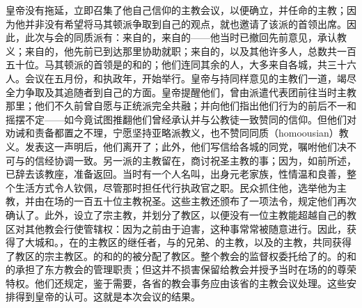 皇帝没有拖延，立即召集了他自己信仰的主教会议，以便确立，并任命的主教；因为他并非没有希望将马其顿派争取到自己的观点，就也邀请了该派的首领出席。因此，此次与会的同质派有：来自的，来自的——他当时已撤回先前意见，承认教义；来自的，他先前已到达那里协助就职；来自的，以及其他许多人，总数共一百五十位。马其顿派的首领是的和的；他们连同其余的人，大多来自各城，共三十六人。会议在五月份，和执政年，开始举行。皇帝与持同样意见的主教们一道，竭尽全力争取及其追随者到自己的方面。皇帝提醒他们，曾由派遣代表团前往当时主教那里；他们不久前曾自愿与正统派完全共融；并向他们指出他们行为的前后不一和摇摆不定——如今竟试图推翻他们曾经承认并与公教徒一致赞同的信仰。但他们对劝诫和责备都置之不理，宁愿坚持亚略派教义，也不赞同同质（homoousian）教义。发表这一声明后，他们离开了；此外，他们写信给各城的同党，嘱咐他们决不可与的信经协调一致。另一派的主教留在，商讨祝圣主教的事；因为，如前所述，已辞去该教座，准备返回。当时有一个人名叫，出身元老家族，性情温和良善，整个生活方式令人钦佩，尽管那时担任代行执政官之职。民众抓住他，选举他为主教，并由在场的一百五十位主教祝圣。这些主教还颁布了一项法令，规定他们再次确认了。此外，设立了宗主教，并划分了教区，以便没有一位主教能超越自己的教区对其他教会行使管辖权：因为之前由于迫害，这种事常常被随意进行。因此，获得了大城和。，在的主教区的继任者，与的兄弟、的主教，以及的主教，共同获得了教区的宗主教区。的和的的被分配了教区。整个教会的监督权委托给了的。的和的承担了东方教会的管理职责；但这并不损害保留给教会并授予当时在场的的尊荣特权。他们还规定，鉴于需要，各省的教会事务应由该省的主教会议处理。这些安排得到皇帝的认可。这就是本次会议的结果。\par


